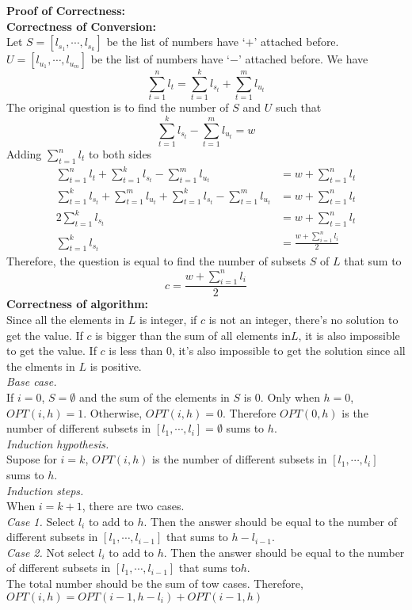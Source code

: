 \documentclass[10.5pt]{article}
\newenvironment{main idea}{\textbf{Main Idea: }}{}
\newenvironment{prcor}{\textbf{Proof of Correctness: }\\}{}
\theoremstyle{remark}
\begin{document}
\begin{prcor}
	\textbf{Correctness of Conversion: }\\
	Let \(S = [l_{s_1},\cdots, l_{s_k}]\) be the list of numbers have `\(+\)' attached before. \(U =[l_{u_1},\cdots,l_{u_m}] \) be the list of numbers have `\(-\)' attached before. We have
	\[
		\sum_{t = 1}^n l_t = \sum_{t = 1}^k l_{s_t} + \sum_{t = 1}^m l_{u_t}
	\]
	The original question is to find the number of \(S\) and \(U\) such that
	\[
		\sum_{t = 1}^k l_{s_t} - \sum_{t = 1}^m l_{u_t} = w
	\]
	Adding \(\sum_{t = 1}^n l_t\) to both sides
	\begin{align*}
		\sum_{t = 1}^n l_t +\sum_{t = 1}^k l_{s_t} - \sum_{t = 1}^m l_{u_t}                              & = w + \sum_{t = 1}^n l_t           \\
		\sum_{t = 1}^k l_{s_t} + \sum_{t = 1}^m l_{u_t} +\sum_{t = 1}^k l_{s_t} - \sum_{t = 1}^m l_{u_t} & = w + \sum_{t = 1}^n l_t           \\
		2 \sum_{t = 1}^k l_{s_t}                                                                         & = w + \sum_{t = 1}^n l_t           \\
		\sum_{t = 1}^k l_{s_t}                                                                           & = \frac{w + \sum_{i = 1}^n l_i}{2}
	\end{align*}
	Therefore, the question is equal to find the number of subsets \(S\) of \(L\) that sum to
	\[
		c = \frac{w + \sum_{i = 1}^n l_i}{2}
	\]
	\textbf{Correctness of algorithm: }\\
	Since all the elements in \(L\) is integer, if \(c\) is not an integer, there's no solution to get the value. If \(c\) is bigger than the sum of all elements in\(L\), it is also impossible to get the value. If \(c\) is less than \(0\), it's also impossible to get the solution since all the elments in \(L\) is positive.\\
	\textit{Base case.}\\
	If \(i = 0\), \(S = \emptyset\) and the sum of the elements in \(S\) is 0.
	Only when \(h = 0\), \(OPT(i, h) = 1\). Otherwise, \(OPT(i, h) = 0\). Therefore \(OPT(0, h)\) is the number of different subsets in \([l_1,\cdots,l_i] = \emptyset\) sums to \(h\).\\
	\textit{Induction hypothesis.}\\
	Supose for \(i = k\), \(OPT(i, h)\) is the number of different subsets in \([l_1,\cdots,l_i] \) sums to \(h\).\\
	\textit{Induction steps.}\\
	When \(i = k + 1\), there are two cases.\\
	\textit{Case 1.} Select \(l_i\) to add to \(h\). Then the answer should be equal to the number of different subsets in \([l_1,\cdots, l_{i - 1}]\) that sums to \(h - l_{i - 1}\).\\
	\textit{Case 2.} Not select \(l_i\) to add to \(h\). Then the answer should be equal to the number of different subsets in \([l_1, \cdots, l_{i - 1}]\) that sums to\(h\).\\
	The total number should be the sum of tow cases. Therefore, \(OPT(i, h) = OPT(i - 1, h - l_i) + OPT(i - 1, h)\)\\
\end{prcor}
\end{document}
